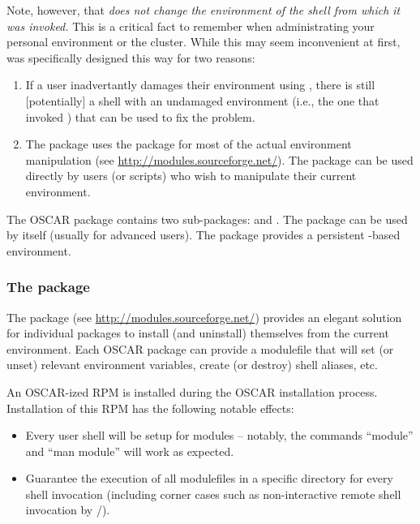 Note, however, that {\em {} does not change the
  environment of the shell from which it was invoked.}  This is a
critical fact to remember when administrating your personal
environment or the cluster.  While this may seem inconvenient at
first,  was specifically designed this way for two
reasons:

\begin{enumerate}
\item If a user inadvertantly damages their environment using
  , there is still [potentially] a shell with an
  undamaged environment (i.e., the one that invoked )
  that can be used to fix the problem.
  
\item The  package uses the  package for
  most of the actual environment manipulation (see
  \url{http://modules.sourceforge.net/}).  The  package
  can be used directly by users (or scripts) who wish to manipulate
  their current environment.
\end{enumerate}

The OSCAR  package contains two sub-packages:
 and .  The  package can
be used by itself (usually for advanced users).  The
 package provides a persistent -based
environment.

\subsubsection{The  package}

The  package (see \url{http://modules.sourceforge.net/})
provides an elegant solution for individual packages to install (and
uninstall) themselves from the current environment.  Each OSCAR
package can provide a modulefile that will set (or unset) relevant
environment variables, create (or destroy) shell aliases, etc.

An OSCAR-ized  RPM is installed during the OSCAR
installation process.  Installation of this RPM has the following
notable effects:

\begin{itemize}
\item Every user shell will be setup for modules -- notably, the
  commands ``{\cmd module}'' and ``{\cmd man module}'' will work as
  expected.

\item Guarantee the execution of all modulefiles in a specific
  directory for every shell invocation (including corner cases such as
  non-interactive remote shell invocation by /).
\end{itemize}

